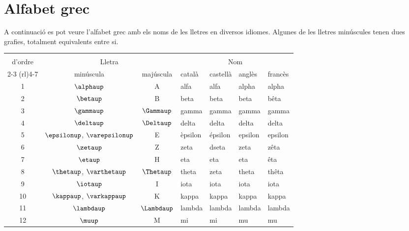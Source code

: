  
 
 
 
 


\section*{Alfabet grec} 

A continuació es pot veure l'alfabet grec
amb els noms de les  lletres en diversos idiomes. Algunes de les lletres minúscules tenen dues grafies, totalment equivalents entre si.

\begin{center}
\begin{threeparttable}
	\begin{tabular}{cccllll}
		\toprule[1pt]
		\renewcommand*{\multirowsetup}{\centering}
		\multirow{2}{15mm}{\rule{0mm}{4.5mm}Número\\d'ordre} & \multicolumn{2}{c}{Lletra} &
		\multicolumn{4}{c}{Nom} \\
		\cmidrule(rl){2-3} \cmidrule(rl){4-7}
		& minúscula & majúscula & català & castellà &  anglès & francès\\
		\midrule
		1  & $\alphaup$ & A & alfa & alfa &  alpha & alpha\\
		2  & $\betaup$ & B & beta & beta &  beta & bêta\\
		3  & $\gammaup$ & $\Gammaup$ & gamma & gamma &  gamma & gamma\\
		4  & $\deltaup$ & $\Deltaup$ & delta & delta &  delta & delta\\
		5  & $\epsilonup$, $\varepsilonup$ & E & èpsilon & épsilon &  epsilon & epsilon\\
		6  & $\zetaup$ & Z & zeta & dseta &  zeta & zêta\\
		7  & $\etaup$ & H & eta & eta &  eta & êta\\
		8  & $\thetaup$, $\varthetaup$ & $\Thetaup$ & theta & zeta &  theta & thêta\\
		9  & $\iotaup$ & I & iota & iota &  iota & iota\\
		10 & $\kappaup$, $\varkappaup$ & K & kappa & kappa &  kappa & kappa\\
		11 & $\lambdaup$ & $\Lambdaup$ & lambda & lambda &  lambda &lambda\\
		12 & $\muup$ & M & mi & mi &  mu & mu\\

\end{tabular}
\end{threeparttable}
\end{center}
